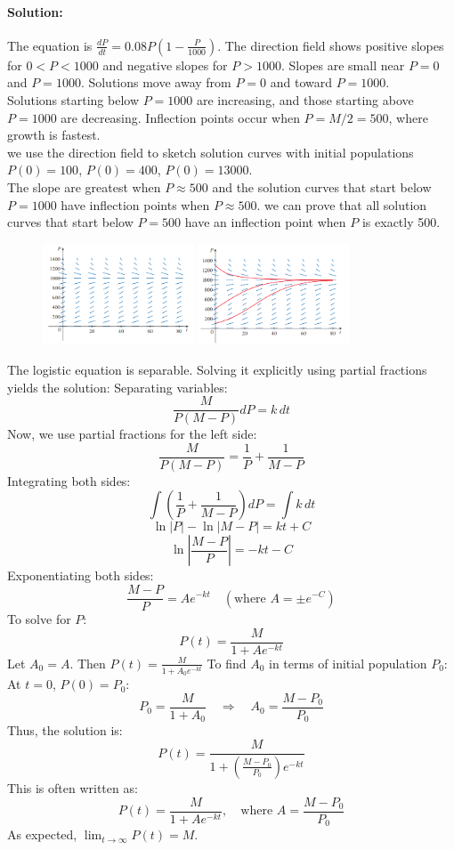 \documentclass{article}
\begin{document}
\paragraph{Solution:}
The equation is $\frac{dP}{dt} = 0.08P\left(1 - \frac{P}{1000}\right)$.
The direction field shows positive slopes for $0 < P < 1000$ and negative slopes for $P > 1000$.
Slopes are small near $P=0$ and $P=1000$. Solutions move away from $P=0$ and toward $P=1000$.
\\Solutions starting below $P=1000$ are increasing, and those starting above $P=1000$ are decreasing. 
Inflection points occur when $P=M/2=500$, where growth is fastest.
\\we use the direction field to sketch solution curves with initial populations $P(0)=100$, $P(0)=400$, $P(0)=13000$.
\\The slope are greatest when $P \approx 500$ and the solution curves that start below $P=1000$ have inflection points when $P \approx 500$. 
we can prove that all solution curves that start below $P=500$ have an inflection point when $P$ is exactly 500.
\begin{figure}[htbp] %
  \centering %
  \includegraphics[width=0.4\textwidth]{graph1.png} %
  \includegraphics[width=0.4\textwidth]{graph2.png}
\end{figure}
The logistic equation is separable. 
Solving it explicitly using partial fractions yields the solution:
Separating variables:
\[\frac{M}{P(M - P)} dP = k \, dt\]
Now, we use partial fractions for the left side:
\[\frac{M}{P(M - P)} = \frac{1}{P} + \frac{1}{M - P}\]
Integrating both sides:
\[\int \left(\frac{1}{P} + \frac{1}{M - P}\right) dP = \int k \, dt\]
\[\ln|P| - \ln|M - P| = kt + C\]
\[\ln\left|\frac{M - P}{P}\right| = -kt - C\]
Exponentiating both sides:
\[\frac{M - P}{P} = A e^{-kt} \quad (\text{where } A = \pm e^{-C})\]
To solve for $P$:
\[P(t) = \frac{M}{1 + A e^{-kt}}\]
Let $A_0 = A$. Then $P(t) = \frac{M}{1 + A_0 e^{-kt}}$
To find $A_0$ in terms of initial population $P_0$:
At $t=0$, $P(0) = P_0$:
\[P_0 = \frac{M}{1 + A_0} \quad \Rightarrow \quad A_0 = \frac{M - P_0}{P_0}\]
Thus, the solution is:
\[P(t) = \frac{M}{1 + \left(\frac{M - P_0}{P_0}\right) e^{-kt}}\]
This is often written as:
\[P(t) = \frac{M}{1 + A e^{-kt}}, \quad \text{where } A = \frac{M - P_0}{P_0}\]
As expected, $\lim_{t \to \infty} P(t) = M$.
\end{document}
